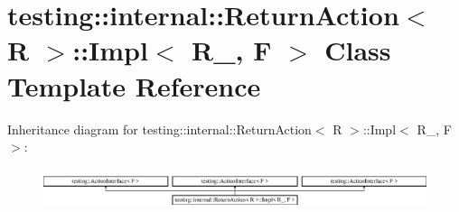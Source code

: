 \hypertarget{classtesting_1_1internal_1_1_return_action_1_1_impl}{}\section{testing\+::internal\+::Return\+Action$<$ R $>$\+::Impl$<$ R\+\_\+, F $>$ Class Template Reference}
\label{classtesting_1_1internal_1_1_return_action_1_1_impl}
Inheritance diagram for testing\+::internal\+::Return\+Action$<$ R $>$\+::Impl$<$ R\+\_\+, F $>$\+:\begin{figure}[H]
\begin{center}
\leavevmode
\includegraphics[height=1.248607cm]{d3/d7f/classtesting_1_1internal_1_1_return_action_1_1_impl}
\end{center}
\end{figure}
